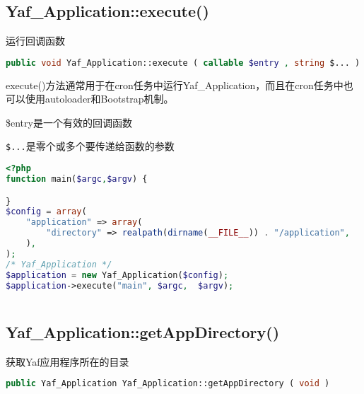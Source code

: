 \begin{lstlisting}[language=PHP]

\end{lstlisting}


\subsection{Yaf\_Application::execute()}

运行回调函数






\begin{lstlisting}[language=PHP]
public void Yaf_Application::execute ( callable $entry , string $... )
\end{lstlisting}

execute()方法通常用于在cron任务中运行Yaf\_Application，而且在cron任务中也可以使用autoloader和Bootstrap机制。

\begin{compactitem}
\item \$entry是一个有效的回调函数
\item \texttt{\$...}是零个或多个要传递给函数的参数
\end{compactitem}



\begin{lstlisting}[language=PHP]
<?php
function main($argc,$argv) {

}
$config = array(
    "application" => array(
        "directory" => realpath(dirname(__FILE__)) . "/application",
    ),
);
/* Yaf_Application */
$application = new Yaf_Application($config);
$application->execute("main", $argc,  $argv);
\end{lstlisting}



\begin{lstlisting}[language=PHP]

\end{lstlisting}


\subsection{Yaf\_Application::getAppDirectory()}

获取Yaf应用程序所在的目录






\begin{lstlisting}[language=PHP]
public Yaf_Application Yaf_Application::getAppDirectory ( void )
\end{lstlisting}



